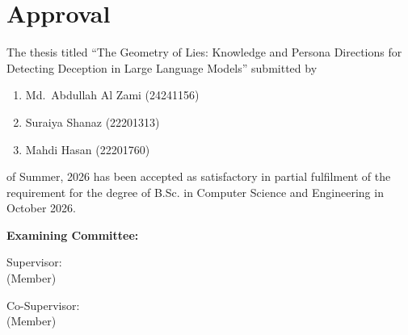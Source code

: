 \section*{Approval}

The thesis titled ``The Geometry of Lies: Knowledge and Persona Directions for Detecting Deception in
Large Language Models'' submitted by
\begin{enumerate}
  \item Md.\ Abdullah Al Zami (24241156)
  \item Suraiya Shanaz (22201313)
  \item Mahdi Hasan (22201760)
\end{enumerate}

of Summer, 2026 has been accepted as satisfactory in partial fulfilment of the requirement for the degree of B.Sc. in Computer Science and Engineering in October 2026.

\vspace{0.5cm}
\textbf{Examining Committee:}

\vspace{1cm}

\newenvironment{member}{\par\begin{minipage}{\linewidth}}{\end{minipage}\par}

\begin{member}
Supervisor:\\
(Member)
\begin{center}
    \hspace{7cm}  \hspace{1cm}
\end{center}
\end{member}

\begin{member}
Co-Supervisor:\\
(Member)
\begin{center}
    \hspace{7cm}  \hspace{1cm}
\end{center}
\end{member}

